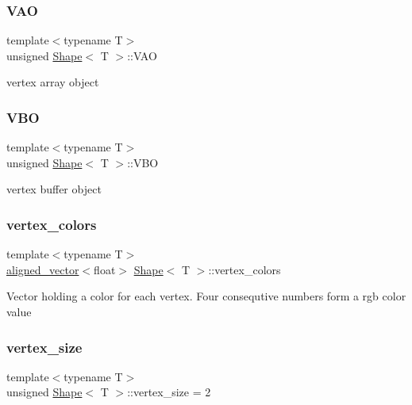 \subsubsection{\texorpdfstring{V\+AO}{VAO}}
{\footnotesize\ttfamily template$<$typename T$>$ \\
unsigned \mbox{\hyperlink{classShape}{Shape}}$<$ T $>$\+::V\+AO\hspace{0.3cm}{\ttfamily [protected]}}

vertex array object \mbox{\label{classShape_a5ca89aadcd89bb475d6ca88acf733ce6}} 
\subsubsection{\texorpdfstring{V\+BO}{VBO}}
{\footnotesize\ttfamily template$<$typename T$>$ \\
unsigned \mbox{\hyperlink{classShape}{Shape}}$<$ T $>$\+::V\+BO\hspace{0.3cm}{\ttfamily [protected]}}

vertex buffer object \mbox{\label{classShape_a1590ef02d7090f28d1ad312fd46f5030}} 
\subsubsection{\texorpdfstring{vertex\+\_\+colors}{vertex\_colors}}
{\footnotesize\ttfamily template$<$typename T$>$ \\
\mbox{\hyperlink{type__definitions_8hpp_a087efd587d66b881646ef378f1919c90}{aligned\+\_\+vector}}$<$float$>$ \mbox{\hyperlink{classShape}{Shape}}$<$ T $>$\+::vertex\+\_\+colors\hspace{0.3cm}{\ttfamily [protected]}}

Vector holding a color for each vertex. Four consequtive numbers form a rgb color value \mbox{\label{classShape_a7cf9cc243cdd64215eca4d81704c7199}} 
\subsubsection{\texorpdfstring{vertex\+\_\+size}{vertex\_size}}
{\footnotesize\ttfamily template$<$typename T$>$ \\
unsigned \mbox{\hyperlink{classShape}{Shape}}$<$ T $>$\+::vertex\+\_\+size = 2\hspace{0.3cm}{\ttfamily [protected]}}

